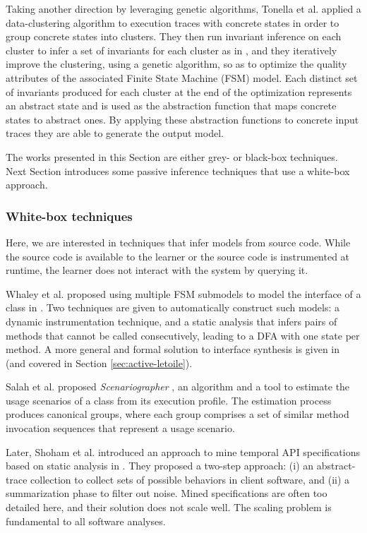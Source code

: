 Taking another direction by leveraging genetic algorithms,
Tonella et al. \cite{TonellaNMLH13} applied a data-clustering
algorithm to execution traces with concrete states in order to
group concrete states into clusters. They then run invariant
inference on each cluster to infer a set of invariants for each
cluster as in \cite{Ernst:1999:DDL:302405.302467,Ernst200735},
and they iteratively improve the clustering, using a genetic
algorithm, so as to optimize the quality attributes of the
associated Finite State Machine (FSM) model. Each distinct set of
invariants produced for each cluster at the end of the
optimization represents an abstract state and is used as the
abstraction function that maps concrete states to abstract ones.
By applying these abstraction functions to concrete input traces
they are able to generate the output model.

The works presented in this Section are either grey- or black-box
techniques. Next Section introduces some passive inference
techniques that use a white-box approach.


\subsubsection{White-box techniques}
\label{sec:passive-white}

Here, we are interested in techniques that infer models from
source code. While the source code is available to the learner or
the source code is instrumented at runtime, the learner does not
interact with the system by querying it.

Whaley et al. proposed using multiple FSM submodels to model the
interface of a class in \cite{Whaley:2002:AEO:566171.566212}. Two
techniques are given to automatically construct such models: a
dynamic instrumentation technique, and a static analysis that
infers pairs of methods that cannot be called consecutively,
leading to a DFA with one state per method. A more general and
formal solution to interface synthesis is given in
\cite{Alur:2005:SIS:1047659.1040314} (and covered in Section
\ref{sec:active-letoile}).

Salah et al. proposed \textit{Scenariographer}
\cite{Salah05scenariographer}, an algorithm and a tool to
estimate the usage scenarios of a class from its execution
profile. The estimation process produces canonical groups, where
each group comprises a set of similar method invocation sequences
that represent a usage scenario.

Later, Shoham et al. introduced an approach to mine temporal API
specifications based on static analysis in
\cite{Shoham:2007:SSM:1273463.1273487}. They proposed a two-step
approach: (i) an abstract-trace collection to collect sets of
possible behaviors in client software, and (ii) a summarization
phase to filter out noise. Mined specifications are often too
detailed here, and their solution does not scale well. The
scaling problem is fundamental to all software analyses.

